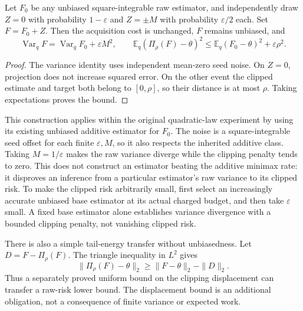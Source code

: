 \begin{proposition}
Let $F_0$ be any unbiased square-integrable raw estimator, and independently
draw $Z=0$ with probability $1-\varepsilon$ and $Z=\pm M$ with probability
$\varepsilon/2$ each. Set $F=F_0+Z$. Then the acquisition cost is unchanged,
$F$ remains unbiased, and
\[
 \operatorname{Var}_qF=\operatorname{Var}_qF_0+\varepsilon M^2,
 \qquad
 \mathbb E_q(\Pi_\rho(F)-\theta)^2
 \le\mathbb E_q(F_0-\theta)^2+\varepsilon\rho^2.
\]
\end{proposition}
\begin{proof}
The variance identity uses independent mean-zero seed noise. On $Z=0$,
projection does not increase squared error. On the other event the clipped
estimate and target both belong to $[0,\rho]$, so their distance is at most
$\rho$. Taking expectations proves the bound.
\end{proof}

This construction applies within the original quadratic-law experiment by
using its existing unbiased additive estimator for $F_0$. The noise is a
square-integrable seed offset for each finite $\varepsilon,M$, so it also
respects the inherited additive class. Taking $M=1/\varepsilon$ makes the
raw variance diverge while the clipping penalty tends to zero. This does
not construct an estimator beating the additive minimax rate: it disproves
an inference from a particular estimator's raw variance to its clipped risk.
To make the clipped risk arbitrarily small, first select an increasingly
accurate unbiased base estimator at its actual charged budget, and then take
$\varepsilon$ small. A fixed base estimator alone establishes variance
divergence with a bounded clipping penalty, not vanishing clipped risk.

There is also a simple tail-energy transfer without unbiasedness. Let
$D=F-\Pi_\rho(F)$. The triangle inequality in $L^2$ gives
\[
 \|\Pi_\rho(F)-\theta\|_2\ge\|F-\theta\|_2-\|D\|_2.
\]
Thus a separately proved uniform bound on the clipping displacement can
transfer a raw-risk lower bound. The displacement bound is an additional
obligation, not a consequence of finite variance or expected work.
